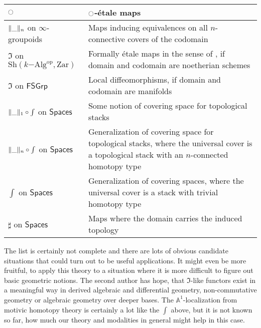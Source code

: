 \documentclass[9pt,twosided]{amsart}
\newcommand{\shape}{\int}
\newcommand{\bA}{\mathbb A}
\newcommand{\Zar}{\ensuremath{\mathrm{Zar}}}
\newcommand{\FSGrp}{\ensuremath{\mathsf{FSGrp}}}
\newcommand{\Spaces}{\ensuremath{\mathsf{Spaces}}}
\begin{document}
\begin{center}
  \begin{tabular}{p{5cm}p{7cm}}
    \toprule
    ${\ocircle}$ & ${\ocircle}$-étale maps  \\
    \midrule
    $\trunc{n}{\_}$ on $\infty$-groupoids & Maps inducing equivalences on all $n$-connective covers of the codomain \\
    $\Im$ on $\mathrm{Sh}(k\mathrm{-Alg}^\mathrm{op} ,\Zar)$ & Formally étale maps in the sense of \cite{GrothendieckDieudonne}, if domain and codomain are noetherian schemes   \\
    $\Im$ on $\FSGrp$ & Local diffeomorphisms, if domain and codomain are manifolds \\
    $\trunc{1}{\_}\circ\shape$ on $\Spaces$ & Some notion of covering space for topological stacks \\
    $\trunc{n}{\_}\circ\shape$ on $\Spaces$ & Generalization of covering space for topological stacks, where the universal cover is a topological stack with an $n$-connected homotopy type \\
    $\shape$ on $\Spaces$ & Generalization of covering spaces, where the universal cover is a stack with trivial homotopy type \\
    $\sharp$ on $\Spaces$ & Maps where the domain carries the induced topology \\
    \bottomrule
  \end{tabular}
\end{center}
The list is certainly not complete and there are lots of obvious candidate situations that could turn out to be useful applications.
It might even be more fruitful, to apply this theory to a situation where it is more difficult to figure out basic geometric notions.
The second author has hope, that $\Im$-like functors exist in a meaningful way in derived algebraic and differential geometry, non-commutative geometry or algebraic geometry over deeper bases. The $\bA^1$-localization from motivic homotopy theory is certainly a lot like the $\shape$ above, but it is not known so far, how much our theory and modalities in general might help in this case. 
\end{document}
